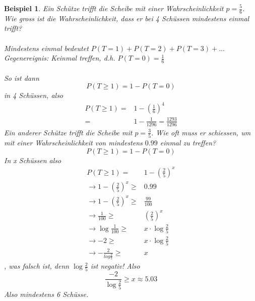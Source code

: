 \documentclass{report}
\newtheorem{myexample}{Beispiel}
\begin{document}
\begin{myexample}
Ein Schütze trifft die Scheibe mit einer Wahrscheinlichkeit $p = \frac{5}{6}$. Wie gross ist die Wahrscheinlichkeit, dass er bei 4 Schüssen mindestens einmal trifft?\\\\
Mindestens einmal bedeutet $P(T=1) + P(T=2) + P(T=3) + ...$\\
Gegenereignis: Keinmal treffen, d.h. $P(T=0) = \frac{1}{6}$\\\\
So ist dann
\begin{equation}
P(T\geq1) = 1 - P(T=0)
\end{equation}
in 4 Schüssen, also
\begin{align*}
P(T \geq 1) =& 1 - \left(\frac{1}{6}\right)^4\\
=& 1 - \frac{1}{1296} = \frac{1293}{1296}
\end{align*}
Ein anderer Schütze trifft die Scheibe mit $p = \frac{3}{5}$. Wie oft muss er schiessen, um mit einer Wahrscheinlichkeit von mindestens $0.99$ einmal zu treffen?
\begin{equation}
P(T \geq 1) = 1 - P(T=0)
\end{equation}
In x Schüssen also
\begin{align*}
P(T \geq 1) =& 1 - \left(\frac{2}{5}\right)^x\\
\longrightarrow 1 - \left(\frac{2}{5}\right)^x \geq & 0.99\\
\longrightarrow 1 - \left(\frac{2}{5}\right)^x \geq & \frac{99}{100}\\
\longrightarrow \frac{1}{100} \geq & \left(\frac{2}{5}\right)^x \\
\longrightarrow \log{\frac{1}{100}} \geq & x \cdot \log{\frac{2}{5}} \\
\longrightarrow -2 \geq & x \cdot \log{\frac{2}{5}} \\
\longrightarrow -\frac{2}{log{\frac{2}{5}}} \geq & x
\end{align*}
, was falsch ist, denn $\log{\frac{2}{5}}$ ist negativ! Also
\begin{equation}
\frac{-2}{\log{\frac{2}{5}}} \geq x \approx 5.03
\end{equation}
Also mindestens 6 Schüsse.
\end{myexample}
\end{document}
